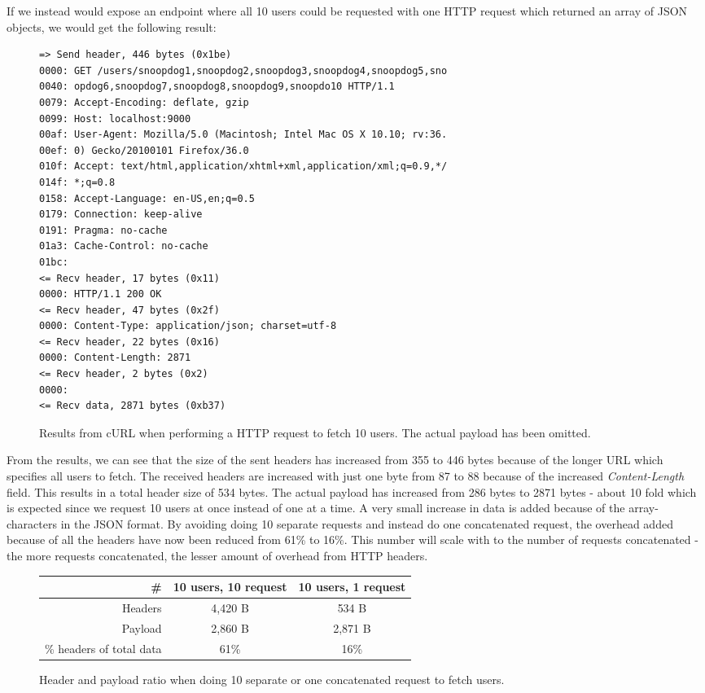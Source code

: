 \documentclass{cslthse-msc}
\begin{document}
If we instead would expose an endpoint where all 10 users could be requested with one HTTP request which returned an array of JSON objects, we would get the following result:

\begin{figure}[H]
  \centering
\begin{lstlisting}[breaklines=true]
=> Send header, 446 bytes (0x1be)
0000: GET /users/snoopdog1,snoopdog2,snoopdog3,snoopdog4,snoopdog5,sno
0040: opdog6,snoopdog7,snoopdog8,snoopdog9,snoopdo10 HTTP/1.1
0079: Accept-Encoding: deflate, gzip
0099: Host: localhost:9000
00af: User-Agent: Mozilla/5.0 (Macintosh; Intel Mac OS X 10.10; rv:36.
00ef: 0) Gecko/20100101 Firefox/36.0
010f: Accept: text/html,application/xhtml+xml,application/xml;q=0.9,*/
014f: *;q=0.8
0158: Accept-Language: en-US,en;q=0.5
0179: Connection: keep-alive
0191: Pragma: no-cache
01a3: Cache-Control: no-cache
01bc:
<= Recv header, 17 bytes (0x11)
0000: HTTP/1.1 200 OK
<= Recv header, 47 bytes (0x2f)
0000: Content-Type: application/json; charset=utf-8
<= Recv header, 22 bytes (0x16)
0000: Content-Length: 2871
<= Recv header, 2 bytes (0x2)
0000:
<= Recv data, 2871 bytes (0xb37)
\end{lstlisting}
  \caption{Results from cURL when performing a HTTP request to fetch 10 users. The actual payload has been omitted.}
\end{figure}

From the results, we can see that the size of the sent headers has increased from 355 to 446 bytes because of the longer URL which specifies all users to fetch. The received headers are increased with just one byte from 87 to 88 because of the increased \emph{Content-Length} field. This results in a total header size of 534 bytes. The actual payload has increased from 286 bytes to 2871 bytes - about 10 fold which is expected since we request 10 users at once instead of one at a time. A very small increase in data is added because of the array-characters in the JSON format. By avoiding doing 10 separate requests and instead do one concatenated request, the overhead added because of all the headers have now been reduced from 61\% to 16\%. This number will scale with to the number of requests concatenated - the more requests concatenated, the lesser amount of overhead from HTTP headers.

\begin{figure}[H]
  \centering
    \begin{center}
      \begin{tabular}{ r | c | c }
        \textbf{\#} & \textbf{10 users, 10 request} & \textbf{10 users, 1 request} \\ \hline
        Headers & 4,420 B & 534 B \\ \hline
        Payload & 2,860 B & 2,871 B \\ \hline
        \% headers of total data & 61\% & 16\% \\ \hline
      \end{tabular}
    \end{center}
  \caption{Header and payload ratio when doing 10 separate or one concatenated request to fetch users.}
\end{figure}
\end{document}
